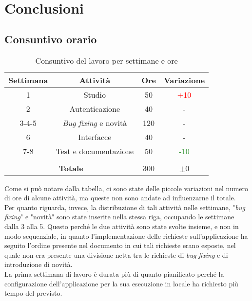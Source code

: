\chapter{Conclusioni}
\label{cap:conclusioni}


\section{Consuntivo orario}

\renewcommand{\arraystretch}{1.3}
\begin{table}[H]
    \centering
        \begin{tabular}{| c | c | c | c |} 
        \hline
        \textbf{Settimana} & \textbf{Attività} & \textbf{Ore} & \textbf{Variazione}\\
        \hline
        1 & Studio & 50 & \textcolor{red}{+10} \\ 
        \hline
        2 & Autenticazione & 40 & - \\
        \hline
        3-4-5 & \emph{Bug fixing} e novità & 120 & - \\
        \hline
        6 & Interfacce & 40 & - \\
        \hline
        7-8 & Test e documentazione & 50 & \textcolor{ForestGreen}{-10}\\
        \hline
        \multicolumn{4}{c}{\rule{0pt}{1em}} \\
        \hline
        \multicolumn{2}{|c|}{\textbf{Totale}} & 300 & $\pm$0\\
        \hline
        \end{tabular}
        \caption{Consuntivo del lavoro per settimane e ore}
\end{table}
\renewcommand{\arraystretch}{1}

\noindent Come si può notare dalla tabella, ci sono state delle piccole variazioni nel numero di ore di alcune attività, ma queste non sono andate ad influenzarne il totale.\\
Per quanto riguarda, invece, la distribuzione di tali attività nelle settimane, "\emph{bug fixing}" e "novità" sono state inserite nella stessa riga, occupando le settimane dalla 3 alla 5. Questo perché le due attività sono state svolte insieme, e non in modo sequenziale, in quanto l'implementazione delle richieste sull'applicazione ha seguito l'ordine presente nel documento in cui tali richieste erano esposte, nel quale non era presente una divisione netta tra le richieste di \emph{bug fixing} e di introduzione di novità.\\
La prima settimana di lavoro è durata più di quanto pianificato perché la configurazione dell'applicazione per la sua esecuzione in locale ha richiesto più tempo del previsto.

